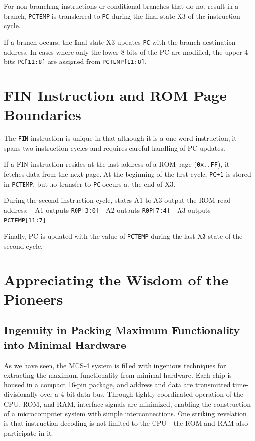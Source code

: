 For non-branching instructions or conditional branches that do not result in a branch, \texttt{PCTEMP} is transferred to \texttt{PC} during the final state X3 of the instruction cycle.

If a branch occurs, the final state X3 updates \texttt{PC} with the branch destination address. In cases where only the lower 8 bits of the PC are modified, the upper 4 bits \texttt{PC[11:8]} are assigned from \texttt{PCTEMP[11:8]}.

\section{FIN Instruction and ROM Page Boundaries}
The \texttt{FIN} instruction is unique in that although it is a one-word instruction, it spans two instruction cycles and requires careful handling of PC updates.

If a FIN instruction resides at the last address of a ROM page (\texttt{0x..FF}), it fetches data from the next page. At the beginning of the first cycle, \texttt{PC+1} is stored in \texttt{PCTEMP}, but no transfer to \texttt{PC} occurs at the end of X3.

During the second instruction cycle, states A1 to A3 output the ROM read address:  
- A1 outputs \texttt{R0P[3:0]}  
- A2 outputs \texttt{R0P[7:4]}  
- A3 outputs \texttt{PCTEMP[11:7]}

Finally, PC is updated with the value of \texttt{PCTEMP} during the last X3 state of the second cycle.

\section{Appreciating the Wisdom of the Pioneers}
\subsection{Ingenuity in Packing Maximum Functionality into Minimal Hardware}
As we have seen, the MCS-4 system is filled with ingenious techniques for extracting the maximum functionality from minimal hardware. Each chip is housed in a compact 16-pin package, and address and data are transmitted time-divisionally over a 4-bit data bus. Through tightly coordinated operation of the CPU, ROM, and RAM, interface signals are minimized, enabling the construction of a microcomputer system with simple interconnections. One striking revelation is that instruction decoding is not limited to the CPU—the ROM and RAM also participate in it.

